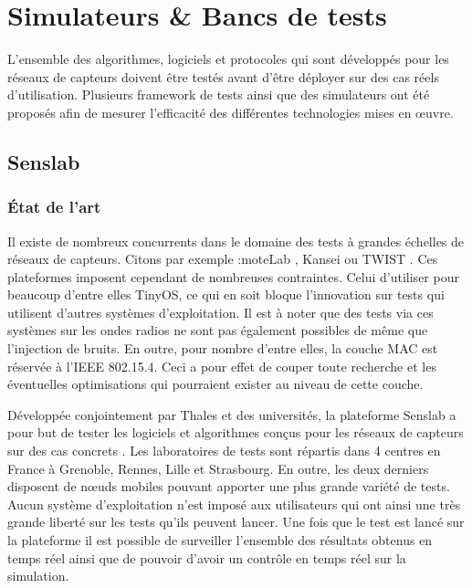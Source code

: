 \section{Simulateurs \& Bancs de tests}

L'ensemble des algorithmes, logiciels et protocoles qui sont développés pour
les réseaux de capteurs doivent être testés avant d'être déployer sur des cas
réels d'utilisation. Plusieurs framework de tests ainsi que des simulateurs ont
été proposés \cite{tsiftes10framework, Bergamini:2010:VWS:1868589.1868611,
eriksson08accurate} afin de mesurer l'efficacité des différentes technologies
mises en œuvre.

\subsection{Senslab}

\subsubsection{État de l'art}

Il existe de nombreux concurrents dans le domaine des tests à grandes échelles
de réseaux de capteurs.  Citons par exemple :moteLab
\cite{Werner-Allen:2005:MWS:1147685.1147769}, Kansei \cite{Arora06kansei:a} ou
TWIST \cite{Handziski:2006:TSR:1132983.1132995}. Ces plateformes imposent
cependant de nombreuses contraintes. Celui d'utiliser pour beaucoup d'entre
elles TinyOS, ce qui en soit bloque l'innovation sur tests qui utilisent
d'autres systèmes d'exploitation. Il est à noter que des tests via ces systèmes
sur les ondes radios ne sont pas également possibles de même que l'injection de
bruits. En outre, pour nombre d'entre elles, la couche MAC est réservée à
l'IEEE 802.15.4.  Ceci a pour effet de couper toute recherche et les
éventuelles optimisations qui pourraient exister au niveau de cette couche.

Développée conjointement par Thales et des universités, la plateforme Senslab
\cite{BURINDESROSIERS-2011-587862, BURINDESROSIERS-2011-599102} a pour but de
tester les logiciels et algorithmes conçus pour les réseaux de capteurs sur des
cas concrets \cite{coapdesign}. Les laboratoires de tests sont répartis dans 4
centres en France à Grenoble, Rennes, Lille et Strasbourg. En outre, les deux
derniers disposent de nœuds mobiles pouvant apporter une plus grande variété
de tests. Aucun système d'exploitation n'est imposé aux utilisateurs qui ont
ainsi une très grande liberté sur les tests qu'ils peuvent lancer. Une fois que
le test est lancé sur la plateforme il est possible de surveiller l'ensemble
des résultats obtenus en temps réel ainsi que de pouvoir d'avoir un contrôle en
temps réel sur la simulation.

